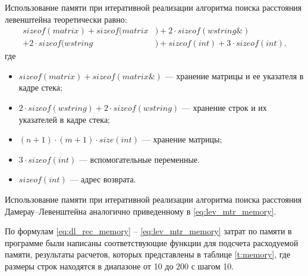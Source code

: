 Использование памяти при итеративной реализации алгоритма поиска расстояния левенштейна теоретически равно:
\begin{equation}
	\label{eq:lev_mtr_memory}
	\begin{aligned}
		sizeof(matrix) + sizeof(matrix&) + 2 \cdot sizeof(wstring\&)\\
        + 2 \cdot sizeof(wstring&) + sizeof(int) + 3 \cdot sizeof(int).
	\end{aligned}
\end{equation}
где 
\begin{itemize}
	\item $sizeof(matrix) + sizeof(matrix\&)$ --- хранение матрицы и ее указателя в кадре стека;
	\item $2 \cdot sizeof(wstring) + 2 \cdot sizeof(wstring)$ --- хранение строк и их указателей в кадре стека;
	\item $(n + 1) \cdot (m + 1) \cdot size(int)$ --- хранение матрицы;
	\item $3 \cdot sizeof(int)$ --- вспомогательные переменные.
	\item $sizeof(int)$ --- адрес возврата.
\end{itemize}

Использование памяти при итеративной реализации алгоритма поиска расстояния Дамерау--Левенштейна аналогично приведенному
в \ref{eq:lev_mtr_memory}.

По формулам \ref{eq:dl_rec_memory} -- \ref{eq:lev_mtr_memory} затрат по памяти в программе были написаны соответствующие функции для подсчета расходуемой памяти, результаты расчетов, которых представлены в таблице \ref{t:memory}, где размеры строк находятся в диапазоне от 10 до 200 с шагом 10.

\clearpage

